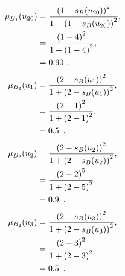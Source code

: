 \documentclass[a4paper,openany]{book}
\begin{document}
				\begin{align}
					\mu_{B_1}(u_{20}) &= \frac{\left(1-s_B(u_{20})\right)^2}{1 + \left(1-s_B(u_{20})\right)^2} ,\\
					&= \frac{\left(1-4\right)^2}{1 + \left(1-4\right)^2} \notag ,\\
					&= 0.90 \enspace. \notag
				\end{align}
				\begin{align}
					\mu_{B_2}(u_1) &= \frac{\left(2-s_B(u_1)\right)^2}{1 + \left(2-s_B(u_1)\right)^2} ,\\
					&= \frac{\left(2-1\right)^2}{1 + \left(2-1\right)^2} \notag ,\\
					&= 0.5 \enspace. \notag
				\end{align}
				\begin{align}
					\mu_{B_2}(u_2) &= \frac{\left(2-s_B(u_2)\right)^2}{1 + \left(2-s_B(u_2)\right)^2} ,\\
					&= \frac{\left(2-2\right)^5}{1 + \left(2-5\right)^2} \notag ,\\
					&= 0.9 \enspace. \notag
				\end{align}
				\begin{align}
					\mu_{B_2}(u_3) &= \frac{\left(2-s_B(u_3)\right)^2}{1 + \left(2-s_B(u_3)\right)^2} ,\\
					&= \frac{\left(2-3\right)^2}{1 + \left(2-3\right)^2} \notag ,\\
					&= 0.5 \enspace. \notag
				\end{align}
\end{document}
